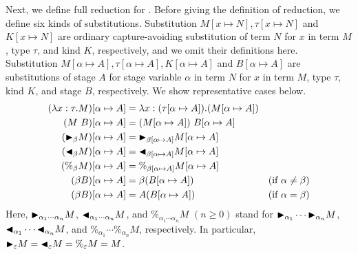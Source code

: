 Next, we define full reduction for \LMD.
Before giving the definition of reduction, we define six kinds of substitutions.
Substitution $M[x\mapsto N], \tau[x \mapsto N]$ and $K[x \mapsto N]$ are
ordinary capture-avoiding substitution of
term $N$ for $x$ in term $M$, type $\tau$, and kind $K$, respectively,
and we omit their definitions here.
Substitution $M[\alpha \mapsto A], \tau [\alpha \mapsto A], K[\alpha \mapsto A]$ and $B[\alpha\mapsto A]$ are
substitutions of stage $A$ for stage variable $\alpha$ in
term $N$ for $x$ in term $M$, type $\tau$, kind $K$, and stage $B$, respectively.
We show representative cases below.
%
\begin{align*}
    (\lambda x:\tau.M)[\alpha \mapsto A] & = \lambda x:(\tau[\alpha \mapsto A]).(M[\alpha \mapsto A])                                  \\
    (M\ B)[\alpha \mapsto A]             & = (M[\alpha \mapsto A])\ B[\alpha\mapsto A]                                                 \\
    ({\mathop{\blacktriangleright}}_\beta M)[\alpha \mapsto A]      & = {\mathop{\blacktriangleright}}_{\beta[\alpha \mapsto A]}M[\alpha \mapsto A]                                          \\
    ({\mathop{\blacktriangleleft}}_\beta M)[\alpha \mapsto A]     & = {\mathop{\blacktriangleleft}}_{\beta[\alpha \mapsto A]}M[\alpha \mapsto A]                                         \\
    (\%_\beta M)[\alpha \mapsto A]       & = \%_{\beta[\alpha \mapsto A]}M[\alpha \mapsto A]                                           \\
    (\beta B)[\alpha \mapsto A]          & = \beta (B[\alpha\mapsto A])                               & (\text{if } \alpha \neq \beta) \\
    (\beta B)[\alpha \mapsto A]          & = A (B[\alpha\mapsto A])                                   & (\text{if } \alpha = \beta)
\end{align*}
Here, ${\mathop{\blacktriangleright}}_{\alpha_1\cdots\alpha_n} M$,
${\mathop{\blacktriangleleft}}_{\alpha_1\cdots\alpha_n} M$, and $\%_{\alpha_1\cdots\alpha_n} M$
$(n \geq 0)$ stand for ${\mathop{\blacktriangleright}}_{\alpha_1} \cdots {\mathop{\blacktriangleright}}_{\alpha_n} M$,
${\mathop{\blacktriangleleft}}_{\alpha_1}\cdots {\mathop{\blacktriangleleft}}_{\alpha_n} M$, and
$\%_{\alpha_1}\cdots \%_{\alpha_n} M$, respectively.  In particular,
${\mathop{\blacktriangleright}}_{\varepsilon} M = {\mathop{\blacktriangleleft}}_{\varepsilon} M = \%_{\varepsilon} M = M$.

